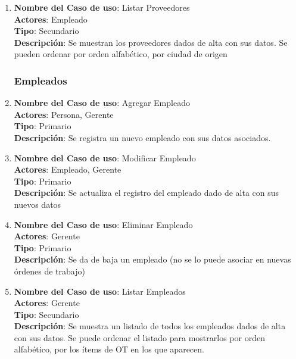 \documentclass[12pt]{extarticle}
\begin{document}
\begin{spacing}{1.2}
\begin{enumerate}
            \item 	\textbf{Nombre del Caso de uso}: Listar Proveedores\\
                    \textbf{Actores}: Empleado\\
                    \textbf{Tipo}: Secundario\\
                    \textbf{Descripción}: Se muestran los proveedores dados de alta con sus datos. Se pueden ordenar por orden alfabético, por ciudad de origen



            \subsubsection{Empleados}



            \item 	\textbf{Nombre del Caso de uso}: Agregar Empleado\\
                    \textbf{Actores}: Persona, Gerente\\
                    \textbf{Tipo}: Primario\\
                    \textbf{Descripción}: Se registra un nuevo empleado con sus datos asociados.
            
            \item 	\textbf{Nombre del Caso de uso}: Modificar Empleado\\
                    \textbf{Actores}: Empleado, Gerente\\
                    \textbf{Tipo}: Primario\\
                    \textbf{Descripción}: Se actualiza el registro del empleado dado de alta con sus nuevos datos
            
            \item 	\textbf{Nombre del Caso de uso}: Eliminar Empleado\\
                    \textbf{Actores}: Gerente\\
                    \textbf{Tipo}: Primario\\
                    \textbf{Descripción}: Se da de baja un empleado (no se lo puede asociar en nuevas órdenes de trabajo)
            
            \item 	\textbf{Nombre del Caso de uso}: Listar Empleados\\
                    \textbf{Actores}: Gerente\\
                    \textbf{Tipo}: Secundario\\
                    \textbf{Descripción}: Se muestra un listado de todos los empleados dados de alta con sus datos. Se puede ordenar el listado para mostrarlos por orden alfabético, por los ítems de OT en los que aparecen.
            

\end{enumerate}
\end{spacing}
\end{document}
